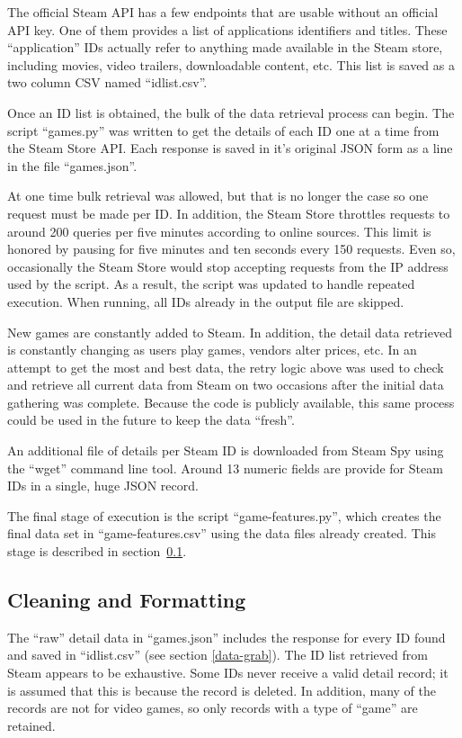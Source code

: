 \documentclass[letterpaper,10pt,twocolumn]{article}
\begin{document}
The official Steam API has a few endpoints that are usable without an official
API key. One of them provides a list of applications identifiers and titles. These
``application'' IDs actually refer to anything made available in the Steam
store, including movies, video trailers, downloadable content, etc. This list
is saved as a two column CSV named ``idlist.csv''.

Once an ID list is obtained, the bulk of the data retrieval process can begin.
The script ``games.py'' was written to get the details of each ID one at a
time from the Steam Store API. Each response is saved in it's original JSON
form as a line in the file ``games.json''.

At one time bulk retrieval was allowed, but that is no longer the case so one
request must be made per ID. In addition, the Steam Store throttles requests
to around 200 queries per five minutes according to online sources. This limit
is honored by pausing for five minutes and ten seconds every 150 requests.
Even so, occasionally the Steam Store would stop accepting requests from the
IP address used by the script. As a result, the script was updated to handle
repeated execution. When running, all IDs already in the output file are
skipped.

New games are constantly added to Steam. In addition, the detail data
retrieved is constantly changing as users play games, vendors alter prices,
etc. In an attempt to get the most and best data, the retry logic above was
used to check and retrieve all current data from Steam on two occasions after
the initial data gathering was complete. Because the code is publicly
available, this same process could be used in the future to keep the data
``fresh''.

An additional file of details per Steam ID is downloaded from Steam Spy using
the ``wget'' command line tool. Around 13 numeric fields are provide for Steam
IDs in a single, huge JSON record.

The final stage of execution is the script ``game-features.py'', which creates
the final data set in ``game-features.csv'' using the data files already
created. This stage is described in section~\ref{data-clean}.

\subsection{Cleaning and Formatting}

\label{data-clean}

The ``raw'' detail data in ``games.json'' includes the response for every ID
found and saved in ``idlist.csv'' (see section \ref{data-grab}). The ID list
retrieved from Steam appears to be exhaustive. Some IDs never receive a
valid detail record; it is assumed that this is because the record is deleted.
In addition, many of the records are not for video games, so only records with
a type of ``game'' are retained.
\end{document}
